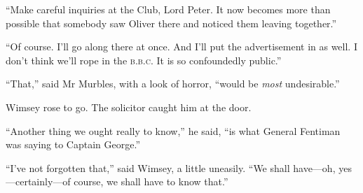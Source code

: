 \enquote{Make careful inquiries at the Club, Lord Peter. It now becomes more than possible that somebody saw Oliver there and noticed them leaving together.}

\enquote{Of course. I'll go along there at once. And I'll put the advertisement in as well. I don't think we'll rope in the \textsc{b.b.c.} It is so confoundedly public.}

\enquote{That,} said Mr Murbles, with a look of horror, \enquote{would be \textit{most} undesirable.}

Wimsey rose to go. The solicitor caught him at the door.

\enquote{Another thing we ought really to know,} he said, \enquote{is what General Fentiman was saying to Captain George.}

\enquote{I've not forgotten that,} said Wimsey, a little uneasily. \enquote{We shall have\allowbreak---\allowbreak oh, yes\allowbreak---\allowbreak certainly---of course, we shall have to know that.}